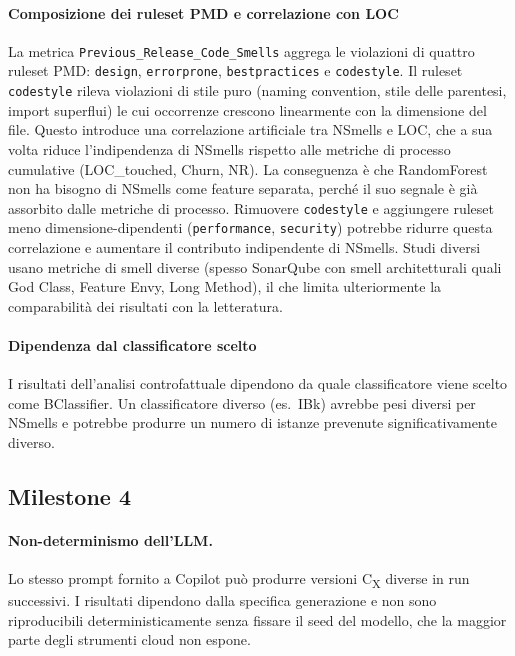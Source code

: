 \paragraph{Composizione dei ruleset PMD e correlazione con LOC}
La metrica \texttt{Previous\_Release\_Code\_Smells} aggrega le violazioni di quattro
ruleset PMD: \texttt{design}, \texttt{errorprone}, \texttt{bestpractices} e
\texttt{codestyle}. Il ruleset \texttt{codestyle} rileva violazioni di stile puro
(naming convention, stile delle parentesi, import superflui) le cui occorrenze crescono
linearmente con la dimensione del file. Questo introduce una correlazione artificiale
tra NSmells e LOC, che a sua volta riduce l'indipendenza di NSmells rispetto alle
metriche di processo cumulative (LOC\_touched, Churn, NR). La conseguenza è che
RandomForest non ha bisogno di NSmells come feature separata, perché il suo segnale
è già assorbito dalle metriche di processo. Rimuovere \texttt{codestyle} e aggiungere
ruleset meno dimensione-dipendenti (\texttt{performance}, \texttt{security}) potrebbe
ridurre questa correlazione e aumentare il contributo indipendente di NSmells.
Studi diversi usano metriche di smell diverse (spesso SonarQube con smell architetturali
quali God Class, Feature Envy, Long Method), il che limita ulteriormente la
comparabilità dei risultati con la letteratura.

\paragraph{Dipendenza dal classificatore scelto}
I risultati dell'analisi controfattuale dipendono da quale classificatore viene scelto
come BClassifier. Un classificatore diverso (es.\ IBk) avrebbe pesi diversi per
NSmells e potrebbe produrre un numero di istanze prevenute significativamente diverso.

\subsection{Milestone 4}

\paragraph{Non-determinismo dell'LLM.}
Lo stesso prompt fornito a Copilot può produrre versioni C\textsubscript{X} diverse
in run successivi. I risultati dipendono dalla specifica generazione e non sono
riproducibili deterministicamente senza fissare il seed del modello, che la maggior
parte degli strumenti cloud non espone.


